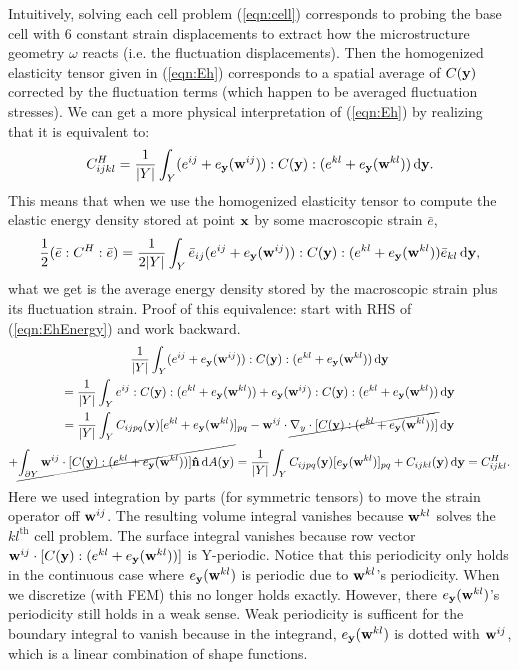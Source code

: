 \documentclass[10pt]{article}
\begin{document}
Intuitively, solving each cell problem (\ref{eqn:cell}) corresponds to probing
the base cell with 6 constant strain displacements to extract how the
microstructure geometry $\omega$ reacts (i.e. the fluctuation displacements).
Then the homogenized elasticity tensor given in (\ref{eqn:Eh}) corresponds to a
spatial average of $C({\bf y})$ corrected by the fluctuation terms (which
happen to be averaged fluctuation stresses). We can get a more physical
interpretation of (\ref{eqn:Eh}) by realizing that it is equivalent to:
\begin{equation}
    \label{eqn:EhEnergy}
    C^H_{ijkl} = \frac{1}{|Y|} \int_Y (e^{ij} + e_{\bf y}({\bf w}^{ij})) : C({\bf y}) : (e^{kl} + e_{\bf y}({\bf w}^{kl})) \, \mathrm{d} {\bf y}.
\end{equation}
This means that when we use the homogenized elasticity tensor to compute the
elastic energy density stored at point ${\bf x}$ by some macroscopic strain
$\bar{e}$,
$$
\frac{1}{2} (\bar{e} : C^H :\bar{e}) =
\frac{1}{2|Y|} \int_Y \bar{e}_{ij} (e^{ij} + e_{\bf y}({\bf w}^{ij})) : C({\bf y}) : (e^{kl} + e_{\bf y}({\bf w}^{kl})) \bar{e}_{kl} \, \mathrm{d} {\bf y},
$$
what we get is the average energy density stored by the macroscopic strain plus
its fluctuation strain. Proof of this equivalence: start with RHS of
(\ref{eqn:EhEnergy}) and work backward.
\begin{gather*}
\frac{1}{|Y|} \int_Y (e^{ij} + e_{\bf y}({\bf w}^{ij})) : C({\bf y}) : (e^{kl} + e_{\bf y}({\bf w}^{kl})) \, \mathrm{d} {\bf y} \\
= \frac{1}{|Y|} \int_Y e^{ij} : C({\bf y}) : (e^{kl} + e_{\bf y}({\bf w}^{kl})) +
    e_{\bf y}({\bf w}^{ij}) : C({\bf y}) : (e^{kl} + e_{\bf y}({\bf w}^{kl})) \, \mathrm{d} {\bf y} \\
    = \frac{1}{|Y|} \int_Y C_{ijpq}({\bf y}) [e^{kl} + e_{\bf y}({\bf w}^{kl})]_{pq} -
{{\bf w}}^{ij} \cdot \cancel{\nabla_y \cdot [C({\bf y}) : (e^{kl} + e_{\bf y}({\bf w}^{kl}))]} \, \mathrm{d} {\bf y} \\
+ \cancel{\int_{\partial Y} {\bf w}^{ij} \cdot [C({\bf y}) : (e^{kl} + e_{\bf y}({\bf w}^{kl}))] {\bf \hat{n}} \, \mathrm{d} A({\bf y})}
= \frac{1}{|Y|} \int_Y C_{ijpq}({\bf y}) [e_{\bf y}({\bf w}^{kl})]_{pq} + C_{ijkl}({\bf y}) \, \mathrm{d} {\bf y} = C^H_{ijkl}.
\end{gather*}
Here we used integration by parts (for symmetric tensors) to move the strain
operator off ${\bf w}^{ij}$. The resulting volume integral vanishes because ${\bf
w}^{kl}$ solves the $kl^\text{th}$ cell problem. The surface integral vanishes
because row vector ${\bf w}^{ij} \cdot [C({\bf y}) : (e^{kl} + e_{\bf
y}({\bf w}^{kl}))]$ is Y-periodic. Notice that this periodicity only holds
in the continuous case where $e_{\bf y}({\bf w}^{kl})$ is periodic due to ${\bf
w}^{kl}$'s
periodicity. When we discretize (with FEM) this no longer holds exactly.
However, there $e_{\bf y}({\bf w}^{kl})$'s periodicity still holds in a weak sense.
Weak periodicity is sufficent for the boundary integral to vanish because in the
integrand, $e_{\bf y}({\bf w}^{kl})$ is dotted with ${\bf w}^{ij}$, which is a linear
combination of shape functions.
\end{document}
